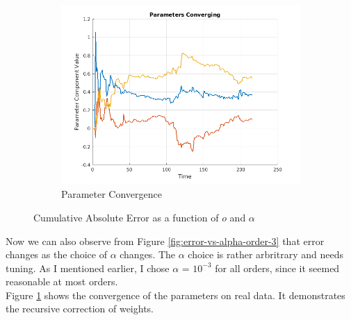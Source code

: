\documentclass[11pt, fleqn]{article}
\begin{document}
\begin{figure}[!h]
\begin{subfigure}[b]{0.3\textwidth}
        \includegraphics[width=\textwidth]{kalman-parameter-converge.png}
		\caption{Parameter Convergence}
		\label{fig:kalman-parameter-converge}
    \end{subfigure}
    \caption{Cumulative Absolute Error as a function of $o$ and $\alpha$}
	\label{fig:o-alpha-error}
\end{figure}

Now we can also observe from Figure \ref{fig:error-vs-alpha-order-3} that error changes as the choice of $\alpha$ changes. The $\alpha$ choice is rather arbritrary and needs tuning. As I mentioned earlier, I chose $\alpha$ = $10^{-3}$ for all orders, since it seemed reasonable at most orders.\\

Figure \ref{fig:kalman-parameter-converge} shows the convergence of the parameters on real data. It demonstrates the recursive correction of weights.
\end{document}
